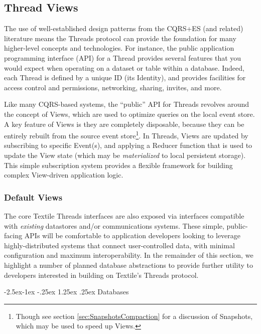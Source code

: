 \documentclass{textile}
\makeatletter
\renewcommand\paragraph{\@startsection{paragraph}{4}{\z@}%
            {-2.5ex\@plus -1ex \@minus -.25ex}%
            {1.25ex \@plus .25ex}%
            {\normalfont\normalsize\itshape}}
\makeatother
\begin{document}
\subsection{Thread Views} \label{sec:threadviews}

The use of well-established design patterns from the CQRS+ES (and related) literature means the Threads protocol can provide the foundation for many higher-level concepts and technologies. For instance, the public application programming interface (API) for a Thread provides several features that you would expect when operating on a dataset or table within a database. Indeed, each Thread is defined by a unique ID (its Identity), and provides facilities for access control and permissions, networking, sharing, invites, and more.

Like many CQRS-based systems, the ``public'' API for Threads revolves around the concept of Views, which are used to optimize queries on the local event store. A key feature of Views is they are completely disposable, because they can be entirely rebuilt from the source event store\footnote{Though see section \ref{sec:SnapshotsCompaction} for a discussion of Snapshots, which may be used to speed up Views.}. In Threads, Views are updated by subscribing to specific Event(s), and applying a Reducer function that is used to update the View state (which may be \emph{materialized} to local persistent storage). This simple subscription system provides a flexible framework for building complex View-driven application logic.

\subsubsection{Default Views}\label{sec:DefaultViews}

The core Textile Threads interfaces are also exposed via interfaces compatible with \emph{existing} datastores and/or communications systems.
These simple, public-facing APIs will be comfortable to application developers looking to leverage highly-distributed systems that connect user-controlled data, with minimal configuration and maximum interoperability.
In the remainder of this section, we highlight a number of planned database abstractions to provide further utility to developers interested in building on Textile's Threads protocol.

\paragraph{Databases}
\end{document}
